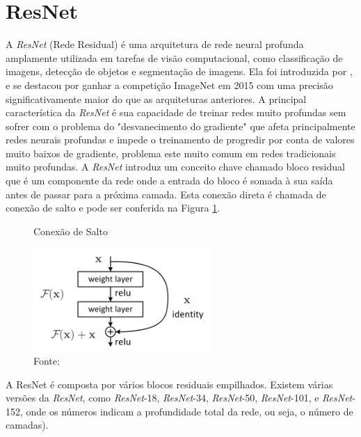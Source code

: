 \section{ResNet}
\label{subsec:cap4_resnet}

A \textit{ResNet} (Rede Residual) é uma arquitetura de rede neural profunda amplamente utilizada em tarefas de visão computacional, como classificação de imagens, detecção de objetos e segmentação de imagens. Ela foi introduzida por \cite{heDeepResidualLearning2015}, e se destacou por ganhar a competição ImageNet em 2015 com uma precisão significativamente maior do que as arquiteturas anteriores. A principal característica da \textit{ResNet} é sua capacidade de treinar redes muito profundas sem sofrer com o problema do "desvanecimento do gradiente" que afeta principalmente redes neurais profundas e impede o treinamento de progredir por conta de valores muito baixos de gradiente, problema este muito comum em redes tradicionais muito profundas. A \textit{ResNet} introduz um conceito chave chamado bloco residual que é um componente da rede onde a entrada do bloco é somada à sua saída antes de passar para a próxima camada. Esta conexão direta é chamada de conexão de salto e pode ser conferida na Figura \ref{fig:fig013}.

\begin{figure}[h!]
    \centering
    \caption{Conexão de Salto}
    \includegraphics[width=0.6\textwidth]{figures/fig013.png}
    \caption*{Fonte: \cite{aiSelfAttentionBasedFusion2023}}
    \label{fig:fig013}
\end{figure}

A ResNet é composta por vários blocos residuais empilhados.
Existem várias versões da \textit{ResNet}, como \textit{ResNet}-18, \textit{ResNet}-34, \textit{ResNet}-50, \textit{ResNet}-101, e \textit{ResNet}-152, onde os números indicam a profundidade total da rede, ou seja, o número de camadas).

